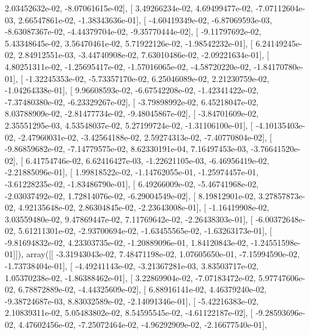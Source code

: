 \documentclass{article}
\begin{document}
          2.03452632e-02,  -8.07061615e-02],
       [  3.49266234e-02,   4.69499477e-02,  -7.07112604e-03,
          2.66547861e-02,  -1.38343636e-01],
       [ -4.60419349e-02,  -6.87069593e-03,  -8.63087367e-02,
         -4.44379704e-02,  -9.35770444e-02],
       [ -9.11797692e-02,   5.43348645e-02,   3.56470461e-02,
          5.71922126e-02,  -1.98542232e-01],
       [  6.24149245e-02,   2.84912551e-03,  -3.44740908e-02,
          7.63010486e-02,  -2.09221634e-01],
       [  4.80251311e-02,  -1.25695417e-02,  -1.57016065e-02,
         -4.58720220e-02,  -1.84170780e-01],
       [ -1.32245353e-02,  -5.73357170e-02,   6.25046089e-02,
          2.21230759e-02,  -1.04264338e-01],
       [  9.96608593e-02,  -6.67542208e-02,  -1.42341422e-02,
         -7.37480380e-02,  -6.23329267e-02],
       [ -3.79898992e-02,   6.45218047e-02,   8.03788909e-02,
         -2.81477734e-02,  -9.48045867e-02],
       [ -3.84701609e-02,   2.35551295e-03,   4.53548037e-02,
          5.27199724e-02,  -1.31106100e-01],
       [ -4.10135403e-02,  -2.47960031e-02,  -3.42564188e-02,
          2.59274313e-02,  -7.40770804e-02],
       [ -9.86859682e-02,  -7.14779575e-02,   8.62330191e-04,
          7.16497453e-03,  -3.76641520e-02],
       [  6.41754746e-02,   6.62416427e-03,  -1.22621105e-03,
         -6.46956419e-02,  -2.21885096e-01],
       [  1.99818522e-02,  -1.14762055e-01,  -1.25974457e-01,
         -3.61228235e-02,  -1.83486790e-01],
       [  6.49266009e-02,  -5.46741968e-02,  -2.03037492e-02,
          1.72814076e-02,  -6.29004549e-02],
       [  8.19812901e-02,   3.27857873e-02,   4.92135648e-02,
          2.86304845e-02,  -2.23643008e-01],
       [ -1.16419908e-02,   3.03559480e-02,   9.47869447e-02,
          7.11769642e-02,  -2.26438303e-01],
       [ -6.00372648e-02,   5.61211301e-02,  -2.93700694e-02,
         -1.63455565e-02,  -1.63263173e-01],
       [ -9.81694832e-02,   4.23303735e-02,  -1.20889096e-01,
          1.84120843e-02,  -1.24551598e-01]]), array([[ -3.31943043e-02,   7.48471198e-02,   1.07605650e-01,
         -7.15994590e-02,  -1.73738404e-01],
       [ -4.49241143e-02,  -3.21367281e-03,   3.83503717e-02,
          1.05370238e-02,  -1.86388462e-01],
       [  3.22869904e-02,  -7.07183472e-02,   5.97747606e-02,
          6.78872889e-02,  -4.44325609e-02],
       [  6.88916141e-02,   4.46379240e-02,  -9.38724687e-03,
          8.83032589e-02,  -2.14091346e-01],
       [ -5.42216383e-02,   2.10839311e-02,   5.05483802e-02,
          8.54595545e-02,  -4.61122187e-02],
       [ -9.28593696e-02,   4.47602456e-02,  -7.25072464e-02,
         -4.96292909e-02,  -2.16677540e-01],
\end{document}
